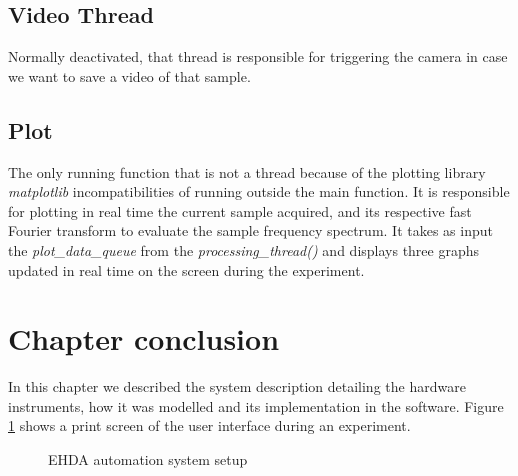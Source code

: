     \subsection{Video Thread}

        Normally deactivated, that thread is responsible for triggering the camera in case we want to save a video of that sample.
    
    \subsection{Plot}

        The only running function that is not a thread because of the plotting library \emph{matplotlib} incompatibilities of running outside the main function. 
        It is responsible for plotting in real time the current sample acquired, and its respective fast Fourier transform to evaluate the sample frequency spectrum.
        It takes as input the \emph{plot\_data\_queue} from the \emph{processing\_thread()} and displays three graphs updated in real time on the screen during the experiment.

  \section{Chapter conclusion}

    In this chapter we described the system description detailing the hardware instruments, how it was modelled and its implementation in the software. Figure \ref{fig:metodology_example1} shows a print screen of the user interface during an experiment.

    \begin{figure}[H]
      \centering
      \caption{EHDA automation system setup}
      \label{fig:metodology_example1}
  \end{figure}
\clearpage
